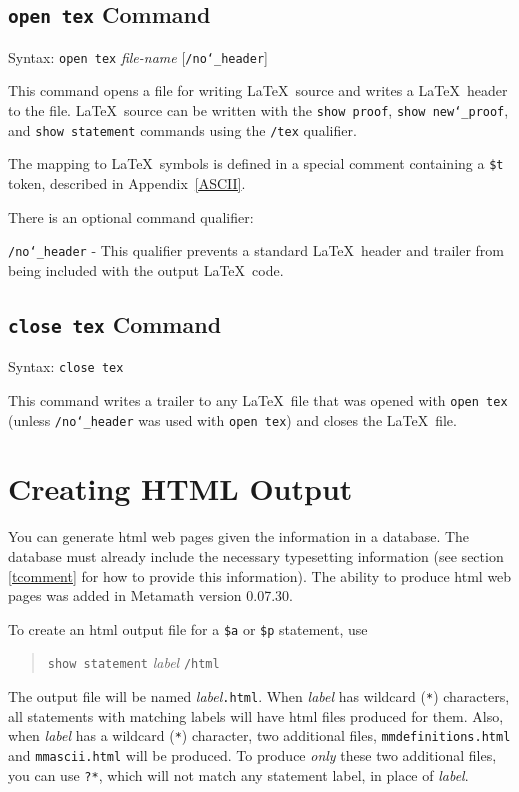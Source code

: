 \subsection{\texttt{open tex} Command}
Syntax:  \texttt{open tex} {\em file-name} [\texttt{/no{\char`\_}header}]

This command opens a file for writing \LaTeX\
source and writes a \LaTeX\ header to the file.
\LaTeX\ source can be written with the \texttt{show proof}, \texttt{show
new{\char`\_}proof}, and \texttt{show statement} commands using the
\texttt{/tex} qualifier.

The mapping to \LaTeX\ symbols is defined in a special comment
containing a \texttt{\$t} token, described in Appendix~\ref{ASCII}.

There is an optional command qualifier:

    \texttt{/no{\char`\_}header} - This qualifier prevents a standard
        \LaTeX\ header and trailer
        from being included with the output \LaTeX\ code.


\subsection{\texttt{close tex} Command}
Syntax:  \texttt{close tex}

This command writes a trailer to any \LaTeX\ file
that was opened with \texttt{open tex} (unless
\texttt{/no{\char`\_}header} was used with \texttt{open tex}) and closes
the \LaTeX\ file.


\section{Creating HTML Output}\label{htmlout}

You can generate {\sc html} web pages given the
information in a database.
The database must already include the necessary typesetting information
(see section \ref{tcomment} for how to provide this information).
The ability to produce {\sc html} web pages was added in Metamath version
0.07.30.

To create an {\sc html} output file for a \texttt{\$a} or \texttt{\$p}
statement, use
\begin{quote}
    \texttt{show statement} {\em label} \texttt{/html}
\end{quote}
The output file will be named {\em label}\texttt{.html}.  When {\em
label} has wildcard (\texttt{*}) characters, all statements with
matching labels will have {\sc html} files produced for them.  Also,
when {\em label} has a wildcard (\texttt{*}) character, two additional
files, \texttt{mmdefinitions.html} and \texttt{mmascii.html} will be
produced.  To produce {\em only} these two additional files, you can use
\texttt{?*}, which will not match any statement label, in place of {\em
label}.

